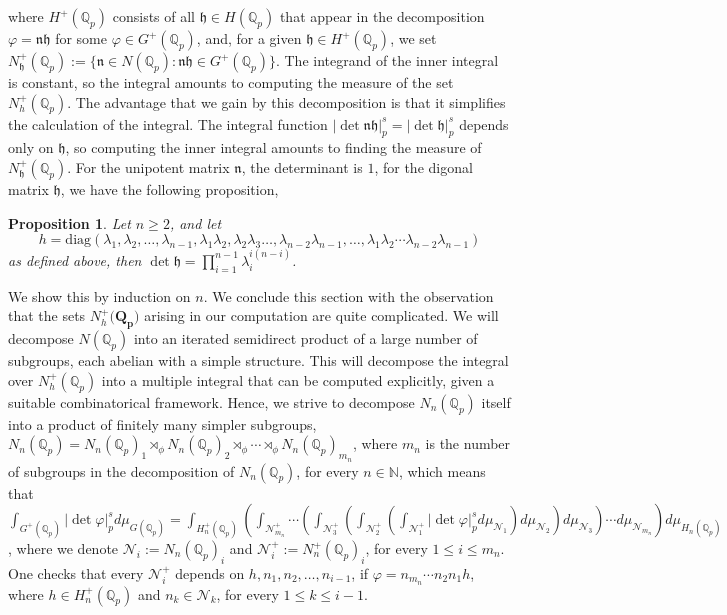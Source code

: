 \documentclass[12pt]{article}
\newtheorem{proposition}[theorem]{Proposition}
\begin{document}
where $H^+(\mathbb{Q}_p)$ consists of all $\mathfrak{h}\in H(\mathbb{Q}_p)$ that appear in the decomposition $\varphi=\mathfrak{n}\mathfrak{h}$ for some $\varphi\in G^+(\mathbb{Q}_p)$, and, for a given $\mathfrak{h}\in H^+(\mathbb{Q}_p)$, we set $N_\mathfrak{h}^+(\mathbb{Q}_p):=\{\mathfrak{n}\in N(\mathbb{Q}_p) : \mathfrak{n}\mathfrak{h}\in{G}^+(\mathbb{Q}_p)\}$. The integrand of the inner integral is constant, so the integral amounts to computing the measure of the set $N_{h}^+(\mathbb{Q}_p)$. The advantage that we gain by this decomposition is that it simplifies the calculation of the integral. The integral function $|\det{\mathfrak{n}\mathfrak{h}}|_p^s=|\det{\mathfrak{h}}|_p^s$ depends only on $\mathfrak{h}$, so computing the inner integral amounts to finding the measure of $N_{\mathfrak{h}}^+(\mathbb{Q}_p)$. For the unipotent matrix $\mathfrak{n}$, the determinant is $1$, for the digonal matrix $\mathfrak{h}$, we have the following proposition,
\begin{proposition}
\label{prop.h.matrix.determinant}
Let $n\geq{2}$, and let \[h=\mathrm{diag}(\lambda_{1},\lambda_{2},\dots,\lambda_{n-1},\lambda_{1}\lambda_{2},\lambda_{2}\lambda_{3}\dots,\lambda_{n-2}\lambda_{n-1},\dots,\lambda_{1}\lambda_{2}\cdots\lambda_{n-2}\lambda_{n-1})\]
as defined above, then $\det{\mathfrak{h}}=\prod_{i=1}^{n-1}\lambda_i^{i(n-i)}$.
\end{proposition}
We show this by induction on $n$.
We conclude this section with the observation that the sets $N_{h}^+(\mathbf{{Q}_p)}$ arising in our computation are quite complicated. We will decompose $N(\mathbb{Q}_p)$ into an iterated semidirect product of a large number of subgroups, each abelian with a simple structure. This will decompose the integral over $N_{h}^+(\mathbb{Q}_p)$ into a multiple integral that can be computed explicitly, given a suitable combinatorical framework. Hence, we strive to decompose $N_n(\mathbb{Q}_p)$ itself into a product of finitely many simpler subgroups, $N_n(\mathbb{Q}_p)= N_n(\mathbb{Q}_p)_1\rtimes_{\phi} N_n(\mathbb{Q}_p)_2\rtimes_{\phi}\cdots\rtimes_{\phi} N_n(\mathbb{Q}_p)_{m_n}$, where $m_n$ is the number of subgroups in the decomposition of $N_n(\mathbb{Q}_p)$, for every $n\in\mathbb{N}$, which means that $\displaystyle\int_{G^+(\mathbb{Q}_p)}|\det\varphi|_p^sd\mu_{G(\mathbb{Q}_p)}=\displaystyle\int_{H_n^+(\mathbb{Q}_p)}\left(\displaystyle\int_{\mathcal{N}^+_{m_n}}\cdots\left(\displaystyle\int_{\mathcal{N}^+_3}\left(\displaystyle\int_{\mathcal{N}^+_2}\left(\displaystyle\int_{\mathcal{N}^+_1}|\det\varphi|_p^sd\mu_{\mathcal{N}_1}\right)d\mu_{\mathcal{N}_2}\right)d\mu_{\mathcal{N}_3}\right)\cdots d\mu_{\mathcal{N}_{m_n}}\right)d\mu_{H_n(\mathbb{Q}_p)}$, where we denote $\mathcal{N}_i:=N_n(\mathbb{Q}_p)_i$ and $\mathcal{N}^+_i:=N_n^+(\mathbb{Q}_p)_i$, for every $1\leq i\leq m_n$. One checks that every $\mathcal{N}^+_i$ depends on ${h},{n}_1,{n}_2,\dots,{n}_{i-1}$, if $\varphi={n}_{m_n}\cdots{n}_2{n}_1{h}$, where ${h}\in H_n^+(\mathbb{Q}_p)$ and ${n}_k\in\mathcal{N}_{k}$, for every $1\leq k\leq i-1$. 
\end{document}
